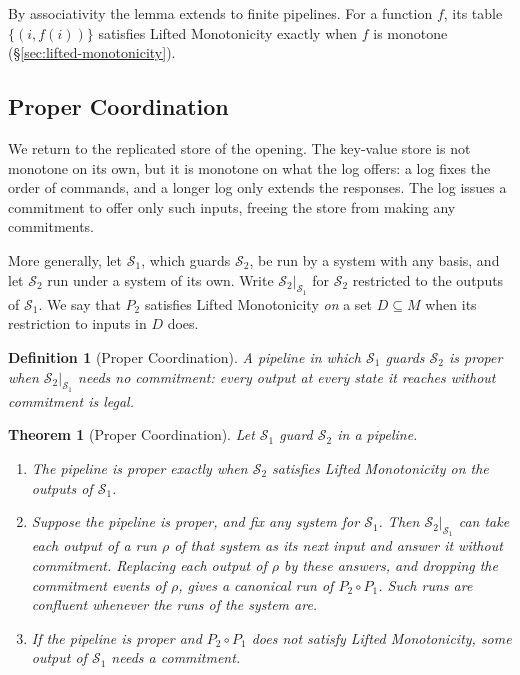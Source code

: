 \documentclass[sigconf]{cidr-2027}
\newtheorem{theorem}{Theorem}
\newtheorem{definition}{Definition}
\theoremstyle{remark}
\newcommand{\commitment}{commitment\xspace}
\newcommand{\commitments}{commitments\xspace}
\newcommand{\Spec}{\mathcal{S}}
\begin{document}
By associativity the lemma extends to finite pipelines.  For a function $f$,
its table $\{(i,f(i))\}$ satisfies Lifted Monotonicity exactly when $f$ is
monotone (\S\ref{sec:lifted-monotonicity}).

\subsection{Proper Coordination}
\label{sec:proper-coordination}

We return to the replicated store of the opening.  The key-value store is not
monotone on its own, but it is monotone on what the log offers: a log fixes
the order of commands, and a longer log only extends the responses.  The log
issues a \commitment to offer only such inputs, freeing the store from making any
\commitments.

More generally, let $\Spec_1$, which guards $\Spec_2$, be run by a system with any basis, and
let $\Spec_2$ run under a system of its own.  Write $\Spec_2|_{\Spec_1}$ for $\Spec_2$ restricted to the outputs of
$\Spec_1$.  We say that $P_2$ satisfies Lifted Monotonicity \emph{on} a set
$D\subseteq M$ when its restriction to inputs in $D$ does.

\begin{definition}[Proper Coordination]
\label{def:proper-coordination}
A pipeline in which $\Spec_1$ guards $\Spec_2$ is \emph{proper} when
$\Spec_2|_{\Spec_1}$ needs no \commitment: every output at every state it
reaches without \commitment is legal.
\end{definition}

\begin{theorem}[Proper Coordination]
\label{thm:proper-coordination}
Let $\Spec_1$ guard $\Spec_2$ in a pipeline.
\begin{enumerate}
  \item The pipeline is proper exactly when $\Spec_2$ satisfies Lifted
        Monotonicity on the outputs of $\Spec_1$.
  \item Suppose the pipeline is proper, and fix any system for $\Spec_1$.
        Then $\Spec_2|_{\Spec_1}$ can take each output of a run $\rho$ of that
        system as its next input and answer it without \commitment.  Replacing
        each output of $\rho$ by these answers, and dropping the \commitment
        events of $\rho$, gives a canonical run of $P_2\circ P_1$.  Such runs are
        confluent whenever the runs of the system are.
  \item If the pipeline is proper and $P_2\circ P_1$ does not satisfy Lifted
        Monotonicity, some output of $\Spec_1$ needs a \commitment.
\end{enumerate}
\end{theorem}
\end{document}
